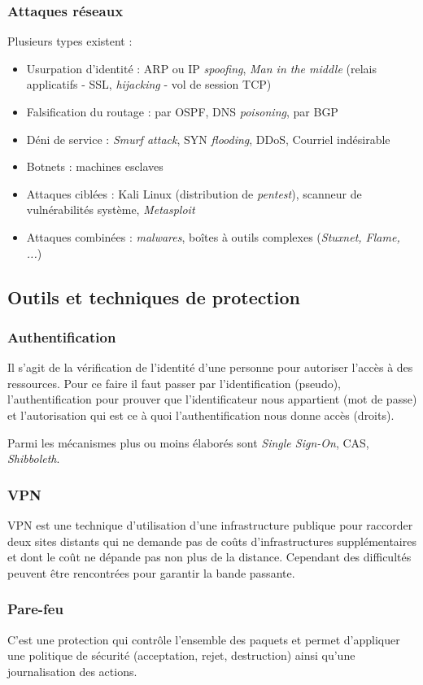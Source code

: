 \documentclass[12pt, a4paper]{article}
\begin{document}
	\subsubsection{Attaques réseaux}
	Plusieurs types existent :
	\begin{itemize}
		\item Usurpation d'identité : ARP ou IP \textit{spoofing}, \textit{Man in
		the middle} (relais applicatifs - SSL, \textit{hijacking} - vol de session
		TCP)
		\item Falsification du routage : par OSPF, DNS \textit{poisoning}, par BGP
		\item Déni de service : \textit{Smurf attack}, SYN \textit{flooding}, DDoS,
		Courriel indésirable
		\item Botnets : machines esclaves
		\item Attaques ciblées : Kali Linux (distribution de \textit{pentest}),
		scanneur de vulnérabilités système, \textit{Metasploit}
		\item Attaques combinées : \textit{malwares}, boîtes à outils complexes
		(\textit{Stuxnet, Flame, ...})
	\end{itemize}
	\subsection{Outils et techniques de protection}
	\subsubsection{Authentification}
	Il s'agit de la vérification de l'identité d'une personne pour autoriser
	l'accès à des ressources. Pour ce faire il faut passer par l'identification
	(pseudo), l'authentification pour prouver que l'identificateur nous appartient
	 (mot de passe) et l'autorisation qui est ce à quoi l'authentification nous
	donne accès (droits).
	\par
	Parmi les mécanismes plus ou moins élaborés sont \textit{Single Sign-On}, CAS,
	 \textit{Shibboleth}.
	\subsubsection{VPN}
	VPN est une technique d'utilisation d'une infrastructure publique pour
	raccorder deux sites distants qui ne demande pas de coûts d'infrastructures
	supplémentaires et dont le coût ne dépande pas non plus de la distance.
	Cependant des difficultés peuvent être rencontrées pour garantir la bande
	passante.
	\subsubsection{Pare-feu}
	C'est une protection qui contrôle l'ensemble des paquets et permet d'appliquer
	 une politique de sécurité (acceptation, rejet, destruction) ainsi qu'une
	journalisation des actions.
\end{document}
